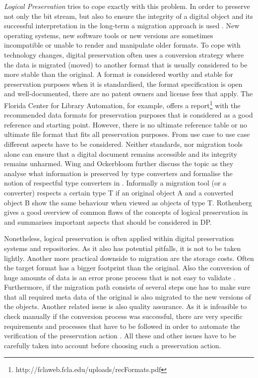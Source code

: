 \textit{Logical Preservation} tries to cope exactly with this problem. In order to preserve not only the bit stream, but also to ensure the integrity of a digital object and its successful interpretation in the long-term a migration approach is used \cite{Lee:2002:SOTADP}. New operating systems, new software tools or new versions are sometimes incompatible or unable to render and manipulate older formats. To cope with technology changes, digital preservation often uses a conversion strategy where the data is migrated (moved) to another format that is usually considered to be more stable than the original. A format is considered worthy and stable for preservation purposes when it is standardised, the format specification is open and well-documented, there are no patent owners and license fees that apply. The Florida Center for Library Automation, for example, offers a report\footnote{http://fclaweb.fcla.edu/uploads/recFormats.pdf} with the recommended data formats for preservation purposes that is considered as a good reference and starting point. However, there is no ultimate reference table or no ultimate file format that fits all preservation purposes. From use case to use case different aspects have to be considered. Neither standards, nor migration tools alone can ensure that a digital document remains accessible and its integrity remains unharmed. Wing and Ockerbloom further discuss the topic as they analyse what information is preserved by type converters and formalise the notion of respectful type converters in \cite{859529}. Informally a migration tool (or a converter) respects a certain type T if an original object A and a converted object B show the same behaviour when viewed as objects of type T. Rothenberg gives a good overview of common flaws of the concepts of logical preservation in \cite{rothenberg:1999:ensuring} and summarises important aspects that should be considered in DP. 

Nonetheless, logical preservation is often applied within digital preservation systems and repositories. As it also has potential pitfalls, it is not to be taken lightly.
Another more practical downside to migration are the storage costs. Often the target format has a bigger footprint than the original. Also the conversion of huge amounts of data is an error prone process that is not easy to validate \cite{Lorie:2001:LTP:379437.379726}. Furthermore, if the migration path consists of several steps one has to make sure that all required meta data of the original is also migrated to the new versions of the objects. Another related issue is also quality assurance. As it is infeasible to check manually if the conversion process was successful, there are very specific requirements and processes that have to be followed in order to automate the verification of the preservation action \cite{feng:2010:qrofm}.
All these and other issues have to be carefully taken into account before choosing such a preservation action.
\newline

